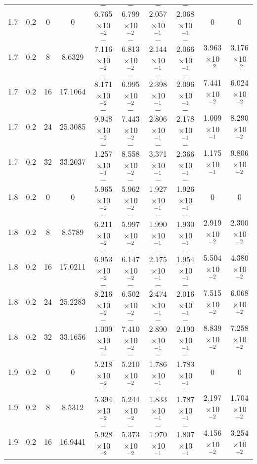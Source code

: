 \documentclass[aps,prd,twocolumn,showpacs,groupedaddress,nofootinbib]{revtex4}
\begin{document}
\begin{widetext}
\begin{table}[h]
\begin{tabular}{|c|c|c|c|c|c|c|c|c|c|}
  1.7&  0.2&  0&  0& $-$6.765$\times$10$^{-2}$& $-$6.799$\times$10$^{-2}$& $-$2.057$\times$10$^{-1}$& $-$2.068$\times$10$^{-1}$&  0&    0\\
  1.7&  0.2&  8&  8.6329& $-$7.116$\times$10$^{-2}$& $-$6.813$\times$10$^{-2}$& $-$2.144$\times$10$^{-1}$& $-$2.066$\times$10$^{-1}$&  3.963$\times$10$^{-2}$&    3.176$\times$10$^{-2}$\\
  1.7&  0.2& 16& 17.1064& $-$8.171$\times$10$^{-2}$& $-$6.995$\times$10$^{-2}$& $-$2.398$\times$10$^{-1}$& $-$2.096$\times$10$^{-1}$&  7.441$\times$10$^{-2}$&    6.024$\times$10$^{-2}$\\
  1.7&  0.2& 24& 25.3085& $-$9.948$\times$10$^{-2}$& $-$7.443$\times$10$^{-2}$& $-$2.806$\times$10$^{-1}$& $-$2.178$\times$10$^{-1}$&  1.009$\times$10$^{-1}$&    8.290$\times$10$^{-2}$\\
  1.7&  0.2& 32& 33.2037& $-$1.257$\times$10$^{-1}$& $-$8.558$\times$10$^{-2}$& $-$3.371$\times$10$^{-1}$& $-$2.366$\times$10$^{-1}$&  1.175$\times$10$^{-1}$&    9.806$\times$10$^{-2}$\\
  1.8&  0.2&  0&  0& $-$5.965$\times$10$^{-2}$& $-$5.962$\times$10$^{-2}$& $-$1.927$\times$10$^{-1}$& $-$1.926$\times$10$^{-1}$&  0&    0\\
  1.8&  0.2&  8&  8.5789& $-$6.211$\times$10$^{-2}$& $-$5.997$\times$10$^{-2}$& $-$1.990$\times$10$^{-1}$& $-$1.930$\times$10$^{-1}$&  2.919$\times$10$^{-2}$&    2.300$\times$10$^{-2}$\\
  1.8&  0.2& 16& 17.0211& $-$6.953$\times$10$^{-2}$& $-$6.147$\times$10$^{-2}$& $-$2.175$\times$10$^{-1}$& $-$1.954$\times$10$^{-1}$&  5.504$\times$10$^{-2}$&    4.380$\times$10$^{-2}$\\
  1.8&  0.2& 24& 25.2283& $-$8.216$\times$10$^{-2}$& $-$6.502$\times$10$^{-2}$& $-$2.474$\times$10$^{-1}$& $-$2.016$\times$10$^{-1}$&  7.515$\times$10$^{-2}$&    6.068$\times$10$^{-2}$\\
  1.8&  0.2& 32& 33.1656& $-$1.009$\times$10$^{-1}$& $-$7.410$\times$10$^{-2}$& $-$2.890$\times$10$^{-1}$& $-$2.190$\times$10$^{-1}$&  8.839$\times$10$^{-2}$&    7.258$\times$10$^{-2}$\\
  1.9&  0.2&  0&  0& $-$5.218$\times$10$^{-2}$& $-$5.210$\times$10$^{-2}$& $-$1.786$\times$10$^{-1}$& $-$1.783$\times$10$^{-1}$&  0&    0\\
  1.9&  0.2&  8&  8.5312& $-$5.394$\times$10$^{-2}$& $-$5.244$\times$10$^{-2}$& $-$1.833$\times$10$^{-1}$& $-$1.787$\times$10$^{-1}$&  2.197$\times$10$^{-2}$&    1.704$\times$10$^{-2}$\\
  1.9&  0.2& 16& 16.9441& $-$5.928$\times$10$^{-2}$& $-$5.373$\times$10$^{-2}$& $-$1.970$\times$10$^{-1}$& $-$1.807$\times$10$^{-1}$&  4.156$\times$10$^{-2}$&    3.254$\times$10$^{-2}$\\

\end{tabular}
\end{table}
\end{widetext}
\end{document}
